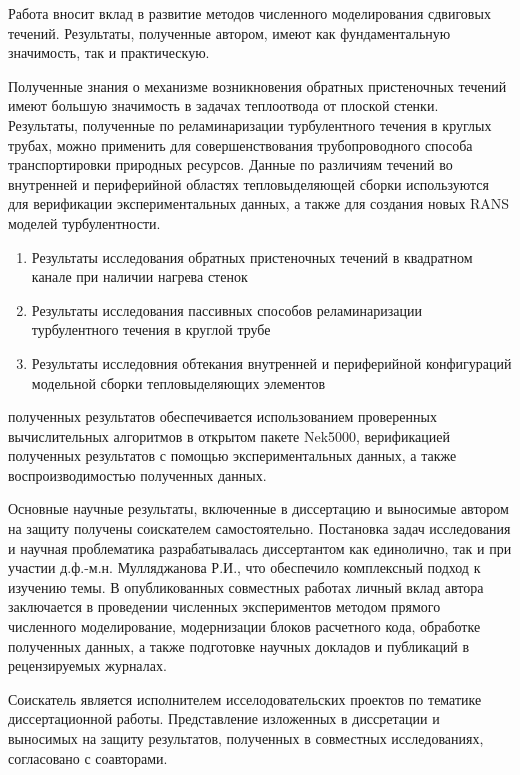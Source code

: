 {\influence} Работа вносит вклад в развитие методов численного моделирования сдвиговых течений. 
Результаты, полученные автором, имеют как фундаментальную значимость, так и практическую. 

Полученные знания о механизме возникновения обратных пристеночных течений имеют большую значимость в 
задачах теплоотвода от плоской стенки. Результаты, полученные по реламинаризации турбулентного течения в круглых
трубах, можно применить для совершенствования трубопроводного способа транспортировки природных ресурсов.
Данные по различиям течений во внутренней и периферийной областях тепловыделяющей сборки используются для 
верификации экспериментальных данных, а также для создания новых RANS моделей турбулентности.


{}
\begin{enumerate}[beginpenalty=10000] %
  \item Результаты исследования обратных пристеночных течений в квадратном канале при наличии нагрева стенок
  \item Результаты исследования пассивных способов реламинаризации турбулентного течения в круглой трубе
  \item Результаты исследовния обтекания внутренней и периферийной конфигураций модельной сборки 
  тепловыделяющих элементов
\end{enumerate}

{\reliability} полученных результатов обеспечивается
использованием проверенных вычислительных алгоритмов в открытом пакете Nek5000,
верификацией полученных результатов с помощью экспериментальных данных, а также
воспроизводимостью полученных данных.

{\contribution} Основные научные результаты, включенные в диссертацию и 
выносимые автором на защиту получены соискателем самостоятельно. Постановка задач исследования
и научная проблематика разрабатывалась диссертантом как единолично, так и при участии
д.ф.-м.н. Мулляджанова Р.И., что обеспечило комплексный подход к изучению темы.
В опубликованных совместных работах личный вклад автора заключается в проведении
численных экспериментов методом прямого численного моделирование, модернизации блоков 
расчетного кода, обработке полученных данных, а также подготовке научных докладов и 
публикаций в рецензируемых журналах.

Соискатель является исполнителем исселодовательских проектов по тематике диссертационной работы.
Представление изложенных в диссретации и выносимых на защиту результатов, полученных в 
совместных исследованиях, согласовано с соавторами.



